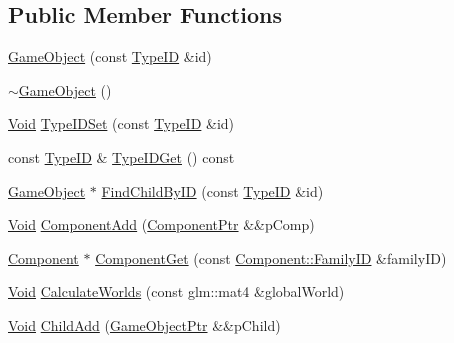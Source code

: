 \subsection*{Public Member Functions}
\begin{DoxyCompactItemize}
\item 
\hyperlink{classgl_1_1_game_object_a54d8bd17754619e3d7333b4fa4251b3e}{Game\-Object} (const \hyperlink{classgl_1_1_game_object_af0b06465180bf63b80fe2b6d1288e4a8}{Type\-I\-D} \&id)
\item 
\hyperlink{classgl_1_1_game_object_aa47b1c3761556efbe3c1df1639e0a588}{$\sim$\-Game\-Object} ()
\item 
\hyperlink{_basic_types_8hpp_afdf0f22c576e6ee1b982f64b839c4bea}{Void} \hyperlink{classgl_1_1_game_object_a5793cf8e0b53314435982cba0c98eebd}{Type\-I\-D\-Set} (const \hyperlink{classgl_1_1_game_object_af0b06465180bf63b80fe2b6d1288e4a8}{Type\-I\-D} \&id)
\item 
const \hyperlink{classgl_1_1_game_object_af0b06465180bf63b80fe2b6d1288e4a8}{Type\-I\-D} \& \hyperlink{classgl_1_1_game_object_a26bcf5fae15ac65b82b4f6e9a8acfe82}{Type\-I\-D\-Get} () const 
\item 
\hyperlink{classgl_1_1_game_object}{Game\-Object} $\ast$ \hyperlink{classgl_1_1_game_object_aa684ba79a38aab36ab4bea64680f3a44}{Find\-Child\-By\-I\-D} (const \hyperlink{classgl_1_1_game_object_af0b06465180bf63b80fe2b6d1288e4a8}{Type\-I\-D} \&id)
\item 
\hyperlink{_basic_types_8hpp_afdf0f22c576e6ee1b982f64b839c4bea}{Void} \hyperlink{classgl_1_1_game_object_aae16450033b01f4547bcdff6ef8fc9d9}{Component\-Add} (\hyperlink{namespacegl_a2cd59688c30d8f0b1168a93aa4bffbcc}{Component\-Ptr} \&\&p\-Comp)
\item 
\hyperlink{classgl_1_1_component}{Component} $\ast$ \hyperlink{classgl_1_1_game_object_a803ef654e89242c91d4e04b9d3907b37}{Component\-Get} (const \hyperlink{classgl_1_1_component_a55fcc946bfc525917e6380e5b71a3f49}{Component\-::\-Family\-I\-D} \&family\-I\-D)
\item 
\hyperlink{_basic_types_8hpp_afdf0f22c576e6ee1b982f64b839c4bea}{Void} \hyperlink{classgl_1_1_game_object_a4759602c4b3ec77ac88d0d1396942abc}{Calculate\-Worlds} (const glm\-::mat4 \&global\-World)
\item 
\hyperlink{_basic_types_8hpp_afdf0f22c576e6ee1b982f64b839c4bea}{Void} \hyperlink{classgl_1_1_game_object_a8556af0edf169a644fa67cc069fdc9e3}{Child\-Add} (\hyperlink{namespacegl_a4caed01d7776fc4f8768dbf8d88d0388}{Game\-Object\-Ptr} \&\&p\-Child)
\item 

\end{DoxyCompactItemize}

